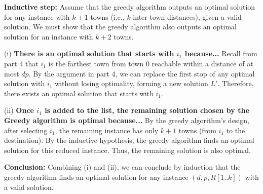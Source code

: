 \documentclass[11pt,fleqn]{exam}
\newenvironment{soln}{\color{solnblue}}{}
\begin{document}
\begin{questions}
\begin{soln}
   \vspace{0.2cm}
   \noindent
   \textbf{Inductive step:}  
   Assume that the greedy algorithm outputs an optimal solution for any instance with \( k+1 \) towns (i.e., \( k \) inter-town distances), given a valid solution. We must show that the greedy algorithm also outputs an optimal solution for an instance with \( k+2 \) towns.
   
   \vspace{0.2cm}
   (i) \textbf{There is an optimal solution that starts with \( i_1 \) because...}  
   Recall from part 4 that \( i_1 \) is the farthest town from town \( 0 \) reachable within a distance of at most \( dp \). By the argument in part 4, we can replace the first stop of any optimal solution with \( i_1 \) without losing optimality, forming a new solution \( L' \). Therefore, there exists an optimal solution that starts with \( i_1 \).
   
   \vspace{0.2cm}
   (ii) \textbf{Once \( i_1 \) is added to the list, the remaining solution chosen by the Greedy algorithm is optimal because...}  
   By the greedy algorithm's design, after selecting \( i_1 \), the remaining instance has only \( k+1 \) towns (from \( i_1 \) to the destination). By the inductive hypothesis, the greedy algorithm finds an optimal solution for this reduced instance. Thus, the remaining solution is also optimal.
   
   \vspace{0.2cm}
   \noindent
   \textbf{Conclusion:}  
   Combining (i) and (ii), we can conclude by induction that the greedy algorithm finds an optimal solution for any instance \((d, p, R[1..k])\) with a valid solution.
\end{soln}
   

\end{questions}
\end{document}
